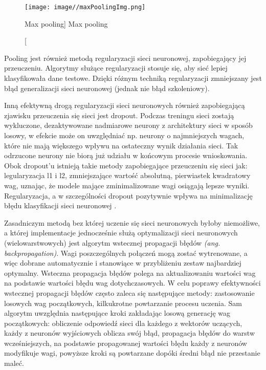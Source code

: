 \documentclass[a4paper,12pt]{article}
\begin{document}
			\begin{figure}[!ht]
				\centering
				\texttt{[image: image//maxPoolingImg.png]}
				\caption
				[Max pooling]
				{Max pooling}
				\label{fig:maxPooling}
			\end{figure}
        
			Pooling jest również metodą regularyzacji sieci neuronowej, zapobiegający jej przeuczeniu. Algorytmy służące regularyzacji stosuje się, aby sieć lepiej klasyfikowała dane testowe. Dzięki różnym techniką regularyzacji zmniejszany jest błąd generalizacji sieci neuronowej (jednak nie błąd szkoleniowy). 
        
        Inną efektywną drogą regularyzacji sieci neuronowych również zapobiegającą zjawisku przeuczenia się sieci jest dropout. 
			Podczas treningu sieci zostają wykluczone, dezaktywowane nadmiarowe neurony z architektury sieci w sposób losowy, 
			w efekcie może on uwzględniać np. neurony o najmniejszych wagach, które nie mają większego wpływu na ostateczny wynik działania sieci. 
			Tak odrzucone neurony nie biorą już udziału w końcowym procesie wnioskowania. Obok dropout'u istnieją takie metody zapobiegające 
			przeuczeniu się sieci jak: legularyzacja l1 i l2, zmniejszające wartość absolutną, pierwiastek kwadratowy wag, uznając, że modele mające 
			zminimalizowane wagi osiągają lepsze wyniki. Regularyzacja, a w szczególności dropout pozytywnie wpływa na minimalizację błędu 
			klasyfikacji sieci neuronowej \cite{15}. 
        
        Zasadniczym metodą bez której uczenie się sieci neuronowych byłoby niemożliwe, a której implementacje jednocześnie służą optymalizacji sieci neuronowych (wielowarstwowych) jest algorytm wstecznej propagacji błędów 
			\textit{(ang. backpropagation)}. Wagi poszczególnych połączeń mogą zostać wytrenowane, a więc dobrane automatycznie i stanowiące 
			w przybliżeniu zestaw najbardziej optymalny. Wsteczna propagacja błędów polega na aktualizowaniu wartości wag na podstawie wartości błędu 
			wag dotychczasowych. W celu poprawy efektywności wstecznej propagacji błędów często zaleca się następujące metody: 
			zastosowanie losowych wag początkowych, kilkukrotne powtarzanie procesu uczenia. Sam algorytm uwzględnia następujące kroki 
			zakładając losową generację wag początkowych: obliczenie odpowiedź sieci dla każdego z wektorów uczących, 
			każdy z neuronów wyjściowych oblicza swój błąd, propagacja błędów do warstw wcześniejszych, na podstawie propagowanej wartości 
			błędu każdy z neuronów modyfikuje wagi, powyższe kroki są powtarzane dopóki średni błąd nie przestanie maleć.
\end{document}
